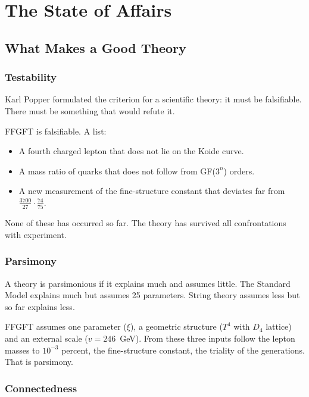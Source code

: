 \documentclass[12pt,oneside]{book}
\begin{document}
\part{The State of Affairs}

\chapter{What Makes a Good Theory}

\section{Testability}

Karl Popper formulated the criterion for a scientific theory: it must be falsifiable. There must be something that would refute it.

FFGFT is falsifiable. A list:

\begin{itemize}
\item A fourth charged lepton that does not lie on the Koide curve.
\item A mass ratio of quarks that does not follow from GF($3^n$) orders.
\item A new measurement of the fine-structure constant that deviates far from $\frac{3700}{27} \cdot \frac{74}{75}$.
\end{itemize}

None of these has occurred so far. The theory has survived all confrontations with experiment.

\section{Parsimony}

A theory is parsimonious if it explains much and assumes little. The Standard Model explains much but assumes 25 parameters. String theory assumes less but so far explains less.

FFGFT assumes one parameter ($\xi$), a geometric structure ($T^4$ with $D_4$ lattice) and an external scale ($v = 246$~GeV). From these three inputs follow the lepton masses to $10^{-3}$ percent, the fine-structure constant, the triality of the generations. That is parsimony.

\section{Connectedness}
\end{document}

